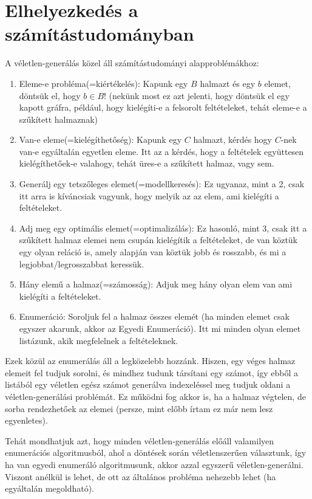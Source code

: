 \documentclass[12pt]{report}
\theoremstyle{definition}
\begin{document}
\section{Elhelyezkedés a számítástudományban}
A véletlen-generálás közel áll számítástudományi alapproblémákhoz:
\begin{enumerate}
\item Eleme-e probléma(=kiértékelés): Kapunk egy $B$ halmazt és egy $b$ elemet, döntsük el, hogy $b\in B$! (nekünk most ez azt jelenti, hogy döntsük el egy kapott gráfra, például, hogy kielégíti-e a felsorolt feltételeket, tehát eleme-e a szűkített halmaznak)
\item Van-e eleme(=kielégíthetőség): Kapunk egy $C$ halmazt, kérdés hogy $C$-nek van-e egyáltalán egyetlen eleme. Itt az a kérdés, hogy a feltételek együttesen kielégíthetőek-e valahogy, tehát üres-e a szűkített halmaz, vagy sem.
\item Generálj egy tetszőleges elemet(=modellkeresés): Ez ugyanaz, mint a 2, csak itt arra is kíváncsiak vagyunk, hogy melyik az az elem, ami kielégíti a feltételeket.
\item Adj meg egy optimális elemet(=optimalizálás): Ez hasonló, mint 3, csak itt a szűkített halmaz elemei nem csupán kielégítik a feltételeket, de van köztük egy olyan reláció is, amely alapján van köztük jobb és rosszabb, és mi a legjobbat/legrosszabbat keressük.
\item Hány elemű a halmaz(=számosság): Adjuk meg hány olyan elem van ami kielégíti a feltételeket.
\item Enumeráció: Soroljuk fel a halmaz összes elemét (ha minden elemet csak egyszer akarunk, akkor az Egyedi Enumeráció). Itt mi minden olyan elemet listázunk, akik megfelelnek a feltételeknek.
\end{enumerate}
Ezek közül az enumerálás áll a legközelebb hozzánk. Hiszen, egy véges halmaz elemeit fel tudjuk sorolni, és mindhez tudunk társítani egy számot, így ebből a listából egy véletlen egész számot generálva indexeléssel meg tudjuk oldani a véletlen-generálási problémát. Ez működni fog akkor is, ha a halmaz végtelen, de sorba rendezhetőek az elemei (persze, mint előbb írtam ez már nem lesz egyenletes).

Tehát mondhatjuk azt, hogy minden véletlen-generálás előáll valamilyen enumerációs algoritmusból, ahol a döntések során véletlenszerűen választunk, így ha van egyedi enumeráló algoritmusunk, akkor azzal egyszerű véletlen-generálni. Viszont anélkül is lehet, de ott az általános probléma nehezebb lehet (ha egyáltalán megoldható).
\end{document}
